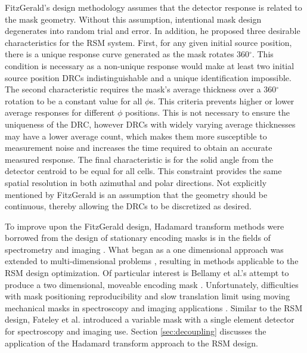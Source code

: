 \documentclass[3p,times]{elsarticle}
\begin{document}
FitzGerald's design methodology assumes that the detector response is related to the mask geometry.  
Without this assumption, intentional mask design degenerates into random trial and error.
In addition, he proposed three desirable characteristics for the RSM system.  
First, for any given initial source position, there is a unique response curve generated as the mask rotates 360$^\circ$.  
This condition is necessary as a non-unique response would make at least two initial source position DRCs indistinguishable and a unique identification impossible.
The second characteristic requires the mask's average thickness over a 360$^\circ$ rotation to be a constant value for all $\phi$s.  
This criteria prevents higher or lower average responses for different $\phi$ positions. 
This is not necessary to ensure the uniqueness of the DRC, however DRCs with widely varying average thicknesses may have a lower average count, which makes them more susceptible to measurement noise and increases the time required to obtain an accurate measured response.
The final characteristic is for the solid angle from the detector centroid to be equal for all cells.  
This constraint provides the same spatial resolution in both azimuthal and polar directions.
Not explicitly mentioned by FitzGerald is an assumption that the geometry should be continuous, thereby allowing the DRCs to be discretized as desired.

To improve upon the FitzGerald design, Hadamard transform methods were borrowed from the design of stationary encoding masks is in the fields of spectrometry and 
imaging \cite{Sloane76, Dyer91, Finger85}. 
What began as a one dimensional approach was extended to multi-dimensional problems \cite{Hammaker95, Hanley00, DeVerse00}, resulting in methods applicable to the RSM design optimization.
Of particular interest is Bellamy et al.'s attempt to produce a two
dimensional, moveable encoding mask \cite{Bellamy97}.  Unfortunately, difficulties with mask positioning reproducibility and slow translation 
limit using moving mechanical masks in spectroscopy and imaging applications \cite{DeVerse00}.
Similar to the RSM design, Fateley et al. introduced a variable mask with a single element detector \cite{Fateley02} for spectroscopy and imaging use.  
Section \ref{sec:decoupling} discusses the application of the Hadamard transform approach to the RSM design.
\end{document}
